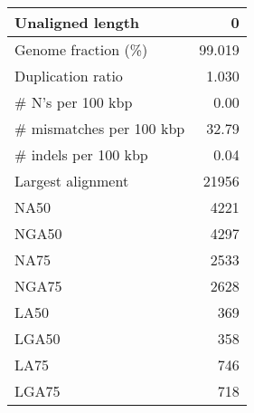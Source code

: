 \documentclass[12pt,a4paper]{article}
\begin{document}
\begin{table}[ht]
\begin{center}
\begin{tabular}{|l*{1}{|r}|}
Unaligned length & 0 \\ \hline
Genome fraction (\%) & 99.019 \\ \hline
Duplication ratio & 1.030 \\ \hline
\# N's per 100 kbp & 0.00 \\ \hline
\# mismatches per 100 kbp & 32.79 \\ \hline
\# indels per 100 kbp & 0.04 \\ \hline
Largest alignment & 21956 \\ \hline
NA50 & 4221 \\ \hline
NGA50 & 4297 \\ \hline
NA75 & 2533 \\ \hline
NGA75 & 2628 \\ \hline
LA50 & 369 \\ \hline
LGA50 & 358 \\ \hline
LA75 & 746 \\ \hline
LGA75 & 718 \\ \hline
\end{tabular}
\end{center}
\end{table}
\end{document}
